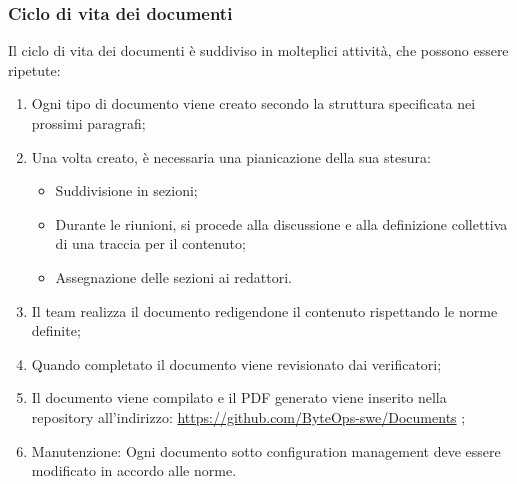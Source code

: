 \documentclass{article}
\begin{document}
\subsubsection{Ciclo di vita dei documenti}
Il ciclo di vita dei documenti è suddiviso in molteplici attività, che possono essere ripetute:
\begin{enumerate}
    \item  Ogni tipo di documento viene creato secondo la struttura specificata nei prossimi paragrafi;
    \item Una volta creato, è necessaria una pianicazione della sua stesura: 
    \begin{itemize}
        \item Suddivisione in sezioni;
        \item Durante le riunioni, si procede alla discussione e alla definizione collettiva di una traccia per il contenuto;
        \item Assegnazione delle sezioni ai redattori.
    \end{itemize}
    \item Il team realizza il documento redigendone il contenuto rispettando le norme definite;
    \item Quando completato il documento viene revisionato dai verificatori;
    \item Il documento viene compilato e il PDF generato viene inserito nella repository all'indirizzo: \href{https://github.com/ByteOps-swe/Documents} {https://github.com/ByteOps-swe/Documents} ;
    \item Manutenzione: Ogni documento sotto configuration management deve essere modificato in accordo alle norme.
\end{enumerate}

   
\end{document}
